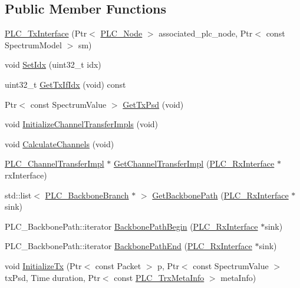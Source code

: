 \subsection*{\-Public \-Member \-Functions}
\begin{DoxyCompactItemize}
\item 
\hyperlink{classns3_1_1PLC__TxInterface_aff6a3c7efa2b90340580e72006525267}{\-P\-L\-C\-\_\-\-Tx\-Interface} (\-Ptr$<$ \hyperlink{classns3_1_1PLC__Node}{\-P\-L\-C\-\_\-\-Node} $>$ associated\-\_\-plc\-\_\-node, \-Ptr$<$ const \-Spectrum\-Model $>$ sm)
\item 
void \hyperlink{classns3_1_1PLC__TxInterface_a88a9bf7b50d5fa11a5adcb09b5398239}{\-Set\-Idx} (uint32\-\_\-t idx)
\item 
uint32\-\_\-t \hyperlink{classns3_1_1PLC__TxInterface_ad89273d8968ace83a49c39bbe3bab3fc}{\-Get\-Tx\-If\-Idx} (void) const 
\item 
\-Ptr$<$ const \-Spectrum\-Value $>$ \hyperlink{classns3_1_1PLC__TxInterface_a85f0732d7d01349f56d6bcbecc3e3c62}{\-Get\-Tx\-Psd} (void)
\item 
void \hyperlink{classns3_1_1PLC__TxInterface_ad6c95936608eeb3b081f9b8eb5e46c87}{\-Initialize\-Channel\-Transfer\-Impls} (void)
\item 
void \hyperlink{classns3_1_1PLC__TxInterface_a9d5e237a329135b8f73178200f94bbc9}{\-Calculate\-Channels} (void)
\item 
\hyperlink{classns3_1_1PLC__ChannelTransferImpl}{\-P\-L\-C\-\_\-\-Channel\-Transfer\-Impl} $\ast$ \hyperlink{classns3_1_1PLC__TxInterface_abcb48efd0fa3c23f04646e93e6c7ebbe}{\-Get\-Channel\-Transfer\-Impl} (\hyperlink{classns3_1_1PLC__RxInterface}{\-P\-L\-C\-\_\-\-Rx\-Interface} $\ast$rx\-Interface)
\item 
std\-::list$<$ \hyperlink{classns3_1_1PLC__BackboneBranch}{\-P\-L\-C\-\_\-\-Backbone\-Branch} $\ast$ $>$ \hyperlink{classns3_1_1PLC__TxInterface_a13001bc1b0947eac4b31d3f86dfbc848}{\-Get\-Backbone\-Path} (\hyperlink{classns3_1_1PLC__RxInterface}{\-P\-L\-C\-\_\-\-Rx\-Interface} $\ast$sink)
\item 
\-P\-L\-C\-\_\-\-Backbone\-Path\-::iterator \hyperlink{classns3_1_1PLC__TxInterface_a7a0f421716fa2999885f3dfa9e00649e}{\-Backbone\-Path\-Begin} (\hyperlink{classns3_1_1PLC__RxInterface}{\-P\-L\-C\-\_\-\-Rx\-Interface} $\ast$sink)
\item 
\-P\-L\-C\-\_\-\-Backbone\-Path\-::iterator \hyperlink{classns3_1_1PLC__TxInterface_abef68692750f3bb5a11bf6c37d1b3af6}{\-Backbone\-Path\-End} (\hyperlink{classns3_1_1PLC__RxInterface}{\-P\-L\-C\-\_\-\-Rx\-Interface} $\ast$sink)
\item 
void \hyperlink{classns3_1_1PLC__TxInterface_ac45fd62e1c2e924026df7b04acb6d0b4}{\-Initialize\-Tx} (\-Ptr$<$ const \-Packet $>$ p, \-Ptr$<$ const \-Spectrum\-Value $>$ tx\-Psd, \-Time duration, \-Ptr$<$ const \hyperlink{classns3_1_1PLC__TrxMetaInfo}{\-P\-L\-C\-\_\-\-Trx\-Meta\-Info} $>$ meta\-Info)
\end{DoxyCompactItemize}
